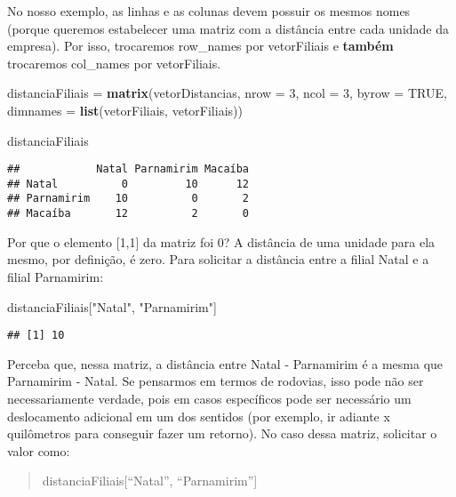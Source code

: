\documentclass[
]{book}
\newenvironment{Shaded}{\begin{snugshade}}{\end{snugshade}}
\newcommand{\DataTypeTok}[1]{\textcolor[rgb]{0.13,0.29,0.53}{#1}}
\newcommand{\DecValTok}[1]{\textcolor[rgb]{0.00,0.00,0.81}{#1}}
\newcommand{\KeywordTok}[1]{\textcolor[rgb]{0.13,0.29,0.53}{\textbf{#1}}}
\newcommand{\NormalTok}[1]{#1}
\newcommand{\OtherTok}[1]{\textcolor[rgb]{0.56,0.35,0.01}{#1}}
\newcommand{\StringTok}[1]{\textcolor[rgb]{0.31,0.60,0.02}{#1}}
\begin{document}
No nosso exemplo, as linhas e as colunas devem possuir os mesmos nomes (porque queremos estabelecer uma matriz com a distância entre cada unidade da empresa). Por isso, trocaremos row\_names por vetorFiliais e \textbf{também} trocaremos col\_names por vetorFiliais.

\begin{Shaded}
\begin{Highlighting}[]
\NormalTok{distanciaFiliais =}\StringTok{ }\KeywordTok{matrix}\NormalTok{(vetorDistancias, }\DataTypeTok{nrow =} \DecValTok{3}\NormalTok{, }\DataTypeTok{ncol =} \DecValTok{3}\NormalTok{, }\DataTypeTok{byrow =} \OtherTok{TRUE}\NormalTok{,}
             \DataTypeTok{dimnames =} \KeywordTok{list}\NormalTok{(vetorFiliais, vetorFiliais))}

\NormalTok{distanciaFiliais}
\end{Highlighting}
\end{Shaded}

\begin{verbatim}
##            Natal Parnamirim Macaíba
## Natal          0         10      12
## Parnamirim    10          0       2
## Macaíba       12          2       0
\end{verbatim}

Por que o elemento {[}1,1{]} da matriz foi 0? A distância de uma unidade para ela mesmo, por definição, é zero. Para solicitar a distância entre a filial Natal e a filial Parnamirim:

\begin{Shaded}
\begin{Highlighting}[]
\NormalTok{distanciaFiliais[}\StringTok{"Natal"}\NormalTok{, }\StringTok{"Parnamirim"}\NormalTok{]}
\end{Highlighting}
\end{Shaded}

\begin{verbatim}
## [1] 10
\end{verbatim}

Perceba que, nessa matriz, a distância entre Natal - Parnamirim é a mesma que Parnamirim - Natal. Se pensarmos em termos de rodovias, isso pode não ser necessariamente verdade, pois em casos específicos pode ser necessário um deslocamento adicional em um dos sentidos (por exemplo, ir adiante x quilômetros para conseguir fazer um retorno). No caso dessa matriz, solicitar o valor como:

\begin{quote}
distanciaFiliais{[}``Natal'', ``Parnamirim''{]}
\end{quote}
\end{document}
